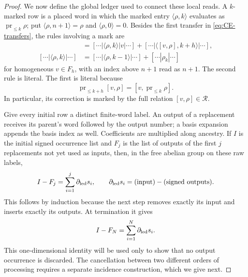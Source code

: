 \documentclass[11pt]{amsart}
\theoremstyle{remark}
\newcommand{\Rel}{\mathcal R}
\newcommand{\pr}{\operatorname{pr}}
\begin{document}
\begin{proof}
	We now define the global ledger used to connect these local reads.  A
	$k$-marked row is a placed word in which the marked entry
	$\langle\rho,k\rangle$ evaluates as $\pr_{\leq k}\rho$; put
	$\langle\rho,n+1\rangle=\rho$ and
	$\langle\rho,0\rangle=0$.  Besides the first transfer in
	\eqref{eq:CE-transfers}, the rules involving a mark are
	\begin{align}
	 [\cdots|v|\langle\rho,k\rangle|\cdots]
	 &= [\cdots|\langle\rho,k\rangle|v|\cdots]
	   +[\cdots|\langle[v,\rho],k+h\rangle|\cdots],
	                                                        \label{eq:marked-transfer}\\
	 [\cdots|\langle\rho,k\rangle|\cdots]
	 &= [\cdots|\langle\rho,k-1\rangle|\cdots]
	   +[\cdots|\rho_k|\cdots]
	                                                        \label{eq:marked-truncation}
	\end{align}
	for homogeneous $v\in F_h$, with an index above $n+1$ read as
	$n+1$.  The second rule is literal.  The first is literal because
	\begin{equation}\label{eq:transfer-truncation-square}
	 \pr_{\leq k+h}[v,\rho]=[v,\pr_{\leq k}\rho].
	\end{equation}
	In particular, its correction is marked by the full relation
	$[v,\rho]\in\Rel$.

	Give every initial row a distinct finite-word label.  An output of a
	replacement receives its parent's word followed by the output number;
	a basis expansion appends the basis index as well.  Coefficients are
	multiplied along ancestry.  If $I$ is the initial signed occurrence list
	and $F_j$ is the list of outputs of the first $j$ replacements not yet
	used as inputs, then, in the free abelian group on these raw labels,
	\begin{equation}\label{eq:prefix-ledger}
	 I-F_j=\sum_{i=1}^{j}\partial_{\rm led}s_i,
	 \qquad
	 \partial_{\rm led}s_i=(\hbox{input})-(\hbox{signed outputs}).
	\end{equation}
	This follows by induction because the next step removes exactly its
	input and inserts exactly its outputs.  At termination it gives
	\begin{equation}\label{eq:complete-ledger}
	 I-F_N=\sum_{i=1}^{N}\partial_{\rm led}s_i.             
	\end{equation}
	This one-dimensional identity will be used only to show that no output
	occurrence is discarded.  The cancellation between two different
	orders of processing requires a separate incidence construction, which
	we give next.


\end{proof}
\end{document}
